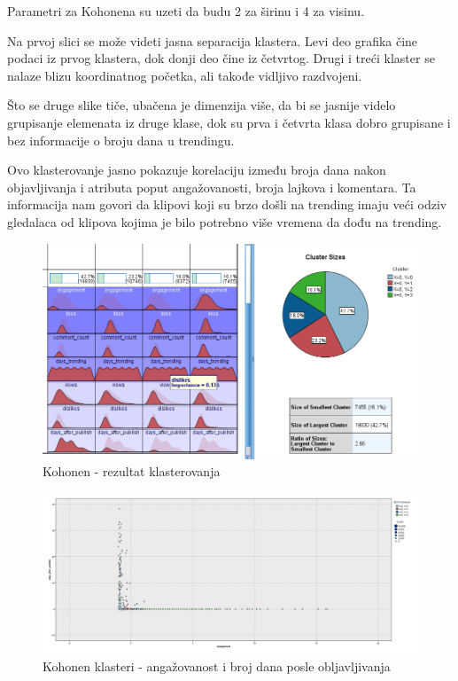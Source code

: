 \documentclass[a4paper]{article}
\theoremstyle{definition}
\begin{document}
Parametri za Kohonena su uzeti da budu 2 za širinu i 4 za visinu.


Na prvoj slici se može videti jasna separacija klastera. Levi deo grafika čine podaci iz prvog klastera, dok donji deo čine iz četvrtog. Drugi i treći klaster se nalaze blizu koordinatnog početka, ali takođe vidljivo razdvojeni.

Što se druge slike tiče, ubačena je dimenzija više, da bi se jasnije videlo grupisanje elemenata iz druge klase, dok su prva i četvrta klasa dobro grupisane i bez informacije o broju dana u trendingu.

Ovo klasterovanje jasno pokazuje korelaciju između broja dana nakon objavljivanja i atributa poput angažovanosti, 
broja lajkova i komentara. Ta informacija nam govori da klipovi koji su brzo došli na trending imaju veći odziv gledalaca od
 klipova kojima je bilo potrebno više vremena da dođu na trending.


\begin{figure}[H]
\begin{center}
    \includegraphics[width=1\textwidth]{Kohonen.png}
    \caption{Kohonen - rezultat klasterovanja}
     \label{fig:asoc2}
\end{center}
\end{figure}




\begin{figure}[H]
\begin{center}
    \includegraphics[width=1\textwidth]{Kohonen_engagement_days_after_publish.png}
    \caption{Kohonen klasteri - angažovanost i broj dana posle obljavljivanja}
     \label{fig:asoc2}
\end{center}
\end{figure}
\end{document}
